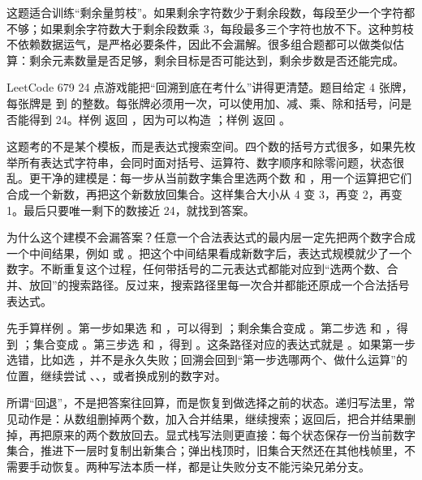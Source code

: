 这题适合训练“剩余量剪枝”。如果剩余字符数少于剩余段数，每段至少一个字符都不够；如果剩余字符数大于剩余段数乘 3，每段最多三个字符也放不下。这种剪枝不依赖数据运气，是严格必要条件，因此不会漏解。很多组合题都可以做类似估算：剩余元素数量是否足够，剩余目标是否可能达到，剩余步数是否还能完成。

LeetCode 679 24 点游戏能把“回溯到底在考什么”讲得更清楚。题目给定 4 张牌，每张牌是  到  的整数。每张牌必须用一次，可以使用加、减、乘、除和括号，问是否能得到 24。样例  返回 ，因为可以构造 ；样例  返回 。

这题考的不是某个模板，而是表达式搜索空间。四个数的括号方式很多，如果先枚举所有表达式字符串，会同时面对括号、运算符、数字顺序和除零问题，状态很乱。更干净的建模是：每一步从当前数字集合里选两个数  和 ，用一个运算把它们合成一个新数，再把这个新数放回集合。这样集合大小从 4 变 3，再变 2，再变 1。最后只要唯一剩下的数接近 24，就找到答案。


为什么这个建模不会漏答案？任意一个合法表达式的最内层一定先把两个数字合成一个中间结果，例如  或 。把这个中间结果看成新数字后，表达式规模就少了一个数字。不断重复这个过程，任何带括号的二元表达式都能对应到“选两个数、合并、放回”的搜索路径。反过来，搜索路径里每一次合并都能还原成一个合法括号表达式。

先手算样例 \code{[4,1,8,7]}。第一步如果选  和 ，可以得到 ；剩余集合变成 \code{[1,7,4]}。第二步选  和 ，得到 ；集合变成 \code{[4,6]}。第三步选  和 ，得到 。这条路径对应的表达式就是 。如果第一步选错，比如选 ，并不是永久失败；回溯会回到“第一步选哪两个、做什么运算”的位置，继续尝试 、、，或者换成别的数字对。

所谓“回退”，不是把答案往回算，而是恢复到做选择之前的状态。递归写法里，常见动作是：从数组删掉两个数，加入合并结果，继续搜索；返回后，把合并结果删掉，再把原来的两个数放回去。显式栈写法则更直接：每个状态保存一份当前数字集合，推进下一层时复制出新集合；弹出栈顶时，旧集合天然还在其他栈帧里，不需要手动恢复。两种写法本质一样，都是让失败分支不能污染兄弟分支。

